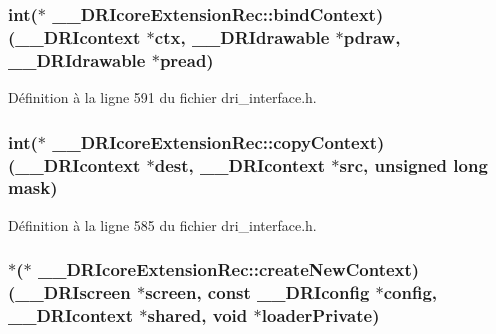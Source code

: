 \hypertarget{struct_____d_r_icore_extension_rec_a0813f2048a824e6b4103c6f52a210fcf}{
\subsubsection[{bind\-Context}]{\setlength{\rightskip}{0pt plus 5cm}int($\ast$ \-\_\-\-\_\-\-D\-R\-Icore\-Extension\-Rec\-::bind\-Context)({\bf \-\_\-\-\_\-\-D\-R\-Icontext} $\ast$ctx, {\bf \-\_\-\-\_\-\-D\-R\-Idrawable} $\ast$pdraw, {\bf \-\_\-\-\_\-\-D\-R\-Idrawable} $\ast$pread)}}\label{struct_____d_r_icore_extension_rec_a0813f2048a824e6b4103c6f52a210fcf}


Définition à la ligne 591 du fichier dri\-\_\-interface.\-h.

\hypertarget{struct_____d_r_icore_extension_rec_a74b07ad3c83c038d8361f97933891d35}{
\subsubsection[{copy\-Context}]{\setlength{\rightskip}{0pt plus 5cm}int($\ast$ \-\_\-\-\_\-\-D\-R\-Icore\-Extension\-Rec\-::copy\-Context)({\bf \-\_\-\-\_\-\-D\-R\-Icontext} $\ast$dest, {\bf \-\_\-\-\_\-\-D\-R\-Icontext} $\ast${\bf src}, unsigned long {\bf mask})}}\label{struct_____d_r_icore_extension_rec_a74b07ad3c83c038d8361f97933891d35}


Définition à la ligne 585 du fichier dri\-\_\-interface.\-h.

\hypertarget{struct_____d_r_icore_extension_rec_a30d6170fea13798429c529fb2bbb3b7a}{
\subsubsection[{create\-New\-Context}]{$\ast$($\ast$ \-\_\-\-\_\-\-D\-R\-Icore\-Extension\-Rec\-::create\-New\-Context)({\bf \-\_\-\-\_\-\-D\-R\-Iscreen} $\ast$screen, const {\bf \-\_\-\-\_\-\-D\-R\-Iconfig} $\ast$config, {\bf \-\_\-\-\_\-\-D\-R\-Icontext} $\ast$shared, {\bf void} $\ast$loader\-Private)}}\label{struct_____d_r_icore_extension_rec_a30d6170fea13798429c529fb2bbb3b7a}


